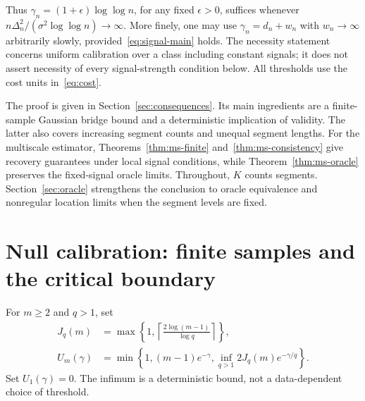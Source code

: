 \documentclass[pdflatex,sn-mathphys-num]{sn-jnl}
\theoremstyle{thmstyleone}
\theoremstyle{thmstyletwo}
\begin{document}
Thus $\gamma_n=(1+\epsilon)\log\log n$, for any fixed $\epsilon>0$,
suffices whenever $n\Delta_n^2/(\sigma^2\log\log n)\to\infty$.
More finely, one may use $\gamma_n=d_n+w_n$ with $w_n\to\infty$ arbitrarily slowly,
provided~\eqref{eq:signal-main} holds. The necessity statement concerns uniform
calibration over a class including constant signals; it does not assert necessity
of every signal-strength condition below. All thresholds use the cost units
in~\eqref{eq:cost}.

The proof is given in Section~\ref{sec:consequences}. Its main ingredients are a
finite-sample Gaussian bridge bound and a deterministic implication of validity.
The latter also covers increasing segment counts and unequal segment lengths.
For the multiscale estimator, Theorems~\ref{thm:ms-finite} and~\ref{thm:ms-consistency}
give recovery guarantees under local signal conditions, while Theorem~\ref{thm:ms-oracle}
preserves the fixed-signal oracle limits. Throughout, $K$ counts segments.
Section~\ref{sec:oracle} strengthens the conclusion to oracle equivalence and
nonregular location limits when the segment levels are fixed.

\section{Null calibration: finite samples and the critical boundary}\label{sec:null}

For $m\ge2$ and $q>1$, set
\begin{equation}\label{eq:peeling-number}
\begin{aligned}
J_q(m)&=\max\left\{1,\left\lceil\frac{2\log(m-1)}{\log q}\right\rceil\right\},\\
U_m(\gamma)&=\min\left\{1,(m-1)e^{-\gamma},
\inf_{q>1}2J_q(m)e^{-\gamma/q}\right\}.
\end{aligned}
\end{equation}
Set $U_1(\gamma)=0$. The infimum is a deterministic bound, not a data-dependent
choice of threshold.
\end{document}
